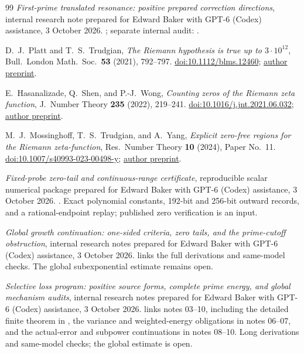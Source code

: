 \documentclass[11pt]{article}
\numberwithin{equation}{section}
\theoremstyle{definition}
\theoremstyle{remark}
\begin{document}
\begin{thebibliography}{99}
\emph{First-prime translated resonance: positive prepared correction directions},
internal research note prepared for Edward Baker with GPT-6 (Codex)
assistance, 3 October 2026.
;
separate internal audit:
.


D.~J.~Platt and T.~S.~Trudgian,
\emph{The Riemann hypothesis is true up to \(3\cdot10^{12}\)},
Bull.\ London Math.\ Soc.\ \textbf{53} (2021), 792--797.
\href{https://doi.org/10.1112/blms.12460}{doi:10.1112/blms.12460};
\href{https://arxiv.org/abs/2004.09765}{author preprint}.

E.~Hasanalizade, Q.~Shen, and P.-J.~Wong,
\emph{Counting zeros of the Riemann zeta function},
J.\ Number Theory \textbf{235} (2022), 219--241.
\href{https://doi.org/10.1016/j.jnt.2021.06.032}
{doi:10.1016/j.jnt.2021.06.032};
\href{https://arxiv.org/abs/2107.06506}{author preprint}.

M.~J.~Mossinghoff, T.~S.~Trudgian, and A.~Yang,
\emph{Explicit zero-free regions for the Riemann zeta-function},
Res.\ Number Theory \textbf{10} (2024), Paper No.~11.
\href{https://doi.org/10.1007/s40993-023-00498-y}
{doi:10.1007/s40993-023-00498-y};
\href{https://arxiv.org/abs/2212.06867}{author preprint}.

\emph{Fixed-probe zero-tail and continuous-range certificate},
reproducible scalar numerical package prepared for Edward Baker with
GPT-6 (Codex) assistance, 3 October 2026.
.
Exact polynomial constants, 192-bit and 256-bit outward records, and
a rational-endpoint replay; published zero verification is an input.

\emph{Global growth continuation: one-sided criteria, zero tails,
and the prime-cutoff obstruction},
internal research notes prepared for Edward Baker with GPT-6 (Codex)
assistance, 3 October 2026.
 links the full derivations
and same-model checks. The global subexponential estimate remains open.


\emph{Selective loss program: positive source forms, complete prime energy,
and global mechanism audits},
internal research notes prepared for Edward Baker with GPT-6 (Codex)
assistance, 3 October 2026.
 links notes 03--10,
including the detailed finite theorem in
,
the variance and weighted-energy obligations in notes 06--07,
and the actual-error and subpower continuations in notes 08--10.
Long derivations and same-model checks; the global estimate is open.


\end{thebibliography}
\end{document}
